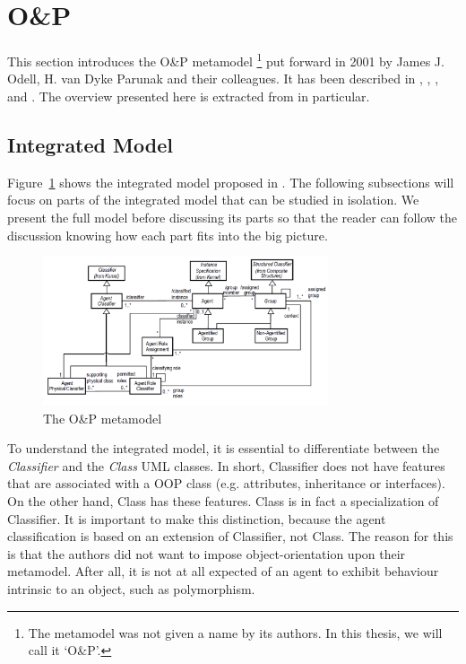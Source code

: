 \section{O\&P}

This section introduces the O\&P metamodel
\footnote{The metamodel was not given a name by its authors. In this thesis, we will call it `O\&P'.}
put forward in 2001 by James J. Odell, H. van Dyke Parunak and their colleagues.
It has been described in \cite{Odell01}, \cite{Parunak02}, \cite{Odell03b}, \cite{Odell04b} and \cite{Odell05}.
The overview presented here is extracted from \cite{Odell05} in particular.

\subsection{Integrated Model}

Figure~\ref{figure:onp-metamodel} shows the integrated model proposed in \cite{Odell05}.
The following subsections will focus on parts of the integrated model that can be studied in isolation.
We present the full model before discussing its parts so that the reader can follow the discussion knowing how each part fits into the big picture.

\begin{figure}[ht]
	\centering
	\includegraphics[width=0.75\textwidth]{images/onp/onp-metamodel.png}
	\caption{The O\&P metamodel}
	\label{figure:onp-metamodel}
\end{figure}

To understand the integrated model, it is essential to differentiate between the \textit{Classifier} and the \textit{Class} UML classes.
In short, Classifier does not have features that are associated with a OOP class (e.g. attributes, inheritance or interfaces).
On the other hand, Class has these features.
Class is in fact a specialization of Classifier.
It is important to make this distinction, because the agent classification is based on an extension of Classifier, not Class.
The reason for this is that the authors did not want to impose object-orientation upon their metamodel.
After all, it is not at all expected of an agent to exhibit behaviour intrinsic to an object, such as polymorphism. 


